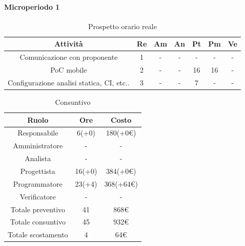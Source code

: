 \paragraph{Microperiodo 1}
\begin{table}[H]
	\centering
	\begin{tabular}{|c|c|c|c|c|c|c|}
		\hline
		\rowcolor{lighter-grayer}
		\textbf{Attività} & \textbf{Re}        & \textbf{Am}        & \textbf{An}        & \textbf{Pt}        & \textbf{Pm}        & \textbf{Ve}        \\ \hline
		
		Comunicazione con proponente & 1 & - & - & - & - & - \\ \hline
		PoC mobile & 2 & - & - & 16 & 16 & - \\ \hline
		Configurazione analisi statica, CI, etc.. & 3 & - & - & 7 & - & - \\ \hline
		
	\end{tabular}
	\caption{ Prospetto orario reale\\}
\end{table}

\begin{table}[H]
	\centering
	\renewcommand{\arraystretch}{1.5}
	\begin{tabular}{|c|c|c|}
		\hline
		\rowcolor{lighter-grayer}
		Ruolo & Ore & Costo \\ \hline
		Responsabile & 6(+0) & 180(+0\euro) \\ \hline
		Amministratore & - & - \\ \hline
		Analista & - & - \\ \hline
		Progettista & 16(+0) & 384(+0\euro) \\ \hline
		Programmatore & 23(+4) & 368(+64\euro) \\ \hline
		Verificatore & - & - \\ \hline
		Totale preventivo & 41 & 868\euro \\ \hline
		Totale consuntivo & 45 & 932\euro \\ \hline
		Totale scostamento & 4 & 64\euro \\ \hline
	\end{tabular}
	\caption{ Consuntivo\\}
\end{table}

